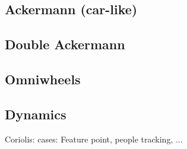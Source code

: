 \subsection{Ackermann (car-like)}

\subsection{Double Ackermann}

\subsection{Omniwheels}


\subsection{Dynamics}
Coriolis: cases: Feature point, people tracking, ...


